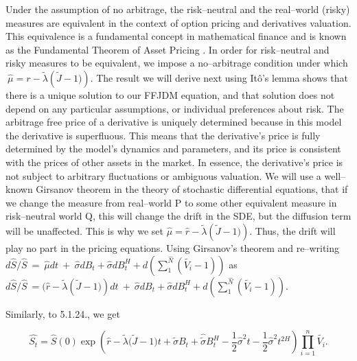 \documentclass[12pt,a4paper]{report}
\numberwithin{equation}{section}
\begin{document}
Under the assumption of no arbitrage, the risk--neutral and the
real--world (risky) measures are equivalent in the context of option
pricing and derivatives valuation. This equivalence is a fundamental
concept in mathematical finance and is known as the Fundamental Theorem
of Asset Pricing \cite{bjrk2009arbitrage_89}. In order for risk--neutral and risky measures
to be equivalent, we impose a no--arbitrage condition under which
\(\ \widehat{\mu} = r - \widetilde{\lambda}\left( \widetilde{J} - 1) \right)\).
The result we will derive next using Itô's lemma shows that there is a
unique solution to our FFJDM equation, and that solution does not depend
on any particular assumptions, or individual preferences about risk. The
arbitrage free price of a derivative is uniquely determined because in
this model the derivative is superfluous. This means that the
derivative's price is fully determined by the model's dynamics and
parameters, and its price is consistent with the prices of other assets
in the market. In essence, the derivative's price is not subject to
arbitrary fluctuations or ambiguous valuation. We will use a well--known
Girsanov theorem in the theory of stochastic differential equations,
that if we change the measure from real--world P to some other equivalent
measure in risk--neutral world Q, this will change the drift in the SDE,
but the diffusion term will be unaffected. This is why we set
\(\widehat{\mu} = \widehat{r} - \widetilde{\lambda}\left( \widetilde{J} - 1) \right)\).
Thus, the drift will play no part in the pricing equations. Using
Girsanov's theorem and re--writing
\(d\widehat{S}/\widehat{S}\  = \ \widehat{\mu}dt\  + \ \widehat{\sigma}dB_{t} + \widehat{\sigma}dB_{t}^{H} + d(\sum_{1}^{\widehat{N}}\left( \widetilde{V_{i}} - 1 \right))\)
as
\(d\widehat{S}/\widehat{S}\  = (\widehat{r} - \widetilde{\lambda}\left( \widetilde{J} - 1) \right)dt\  + \ \widehat{\sigma}dB_{t} + \widehat{\sigma}dB_{t}^{H} + d(\sum_{1}^{\widehat{N}}\left( \widetilde{V_{i}} - 1 \right))\).

Similarly, to 5.1.24., we get

\begin{equation}
\widehat{S_{t}}
= \widehat{S}(0)\exp\!\left(\widehat{r}-\widetilde{\lambda}\bigl(\widetilde{J}-1\bigr)t
+ \widetilde{\sigma}B_{t} + \widehat{\widetilde{\sigma}}B_{t}^{H}
- \frac{1}{2}\widehat{\sigma}^{2}t - \frac{1}{2}\widehat{\sigma}^{2}t^{2H}\right)
\prod_{i=1}^{n}\widetilde{V_{i}}.
\tag{5.1.33}\label{eq:5.1.33}
\end{equation}
\end{document}
